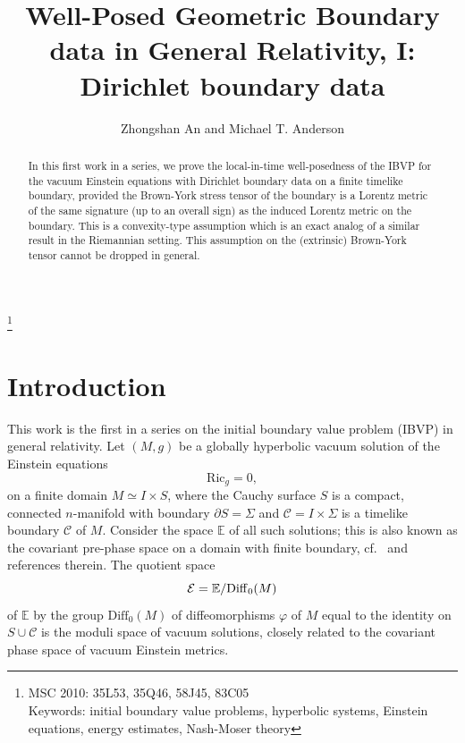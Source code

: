 \documentclass[10pt]{amsart}
\newcommand{\f}{\varphi}
\newcommand{\Si}{\Sigma}
\newcommand{\cC}{{\mathcal C}}
\newcommand{\cE}{{\mathcal E}}
\newcommand{\bE}{\mathbb E}
\newcommand{\Diff}{\mathrm{Diff}}
\newcommand{\Ric}{\mathrm{Ric}}
\newcommand{\be}{\begin{equation}}
\newcommand{\ee}{\end{equation}}
\newcommand{\p}{\partial}
\newcommand{\<}{\langle}
\renewcommand{\>}{\rangle}
\theoremstyle{plain}
\theoremstyle{remark}
\theoremstyle{definition}
\numberwithin{equation}{section}
\begin{document}
\title[ ]{Well-Posed Geometric Boundary data in General Relativity, I: Dirichlet boundary data} 

\author{Zhongshan An and Michael T. Anderson}

\address{Institute of Geometry and Physics, 
University of Science and Technology of China,
No. 99 Xiupu Road, Shanghai, China, 201305}

\address{Department of Mathematics, 
Stony Brook University,
Stony Brook, NY 11794}

\thanks{MSC 2010: 35L53, 35Q46, 58J45, 83C05\\
Keywords: initial boundary value problems, hyperbolic systems, Einstein equations, energy estimates, Nash-Moser theory}

\begin{abstract} 
In this first work in a series, we prove the local-in-time well-posedness of the IBVP for the vacuum Einstein equations with Dirichlet 
boundary data on a finite timelike boundary, provided the Brown-York stress tensor of the boundary is a Lorentz metric of the same signature 
(up to an overall sign) as the induced Lorentz metric on the boundary. This is a convexity-type assumption which is an exact analog of a similar 
result in the Riemannian setting. This assumption on the (extrinsic) Brown-York tensor cannot be dropped in general. 

\end{abstract}

\maketitle 

\section{Introduction}

  This work is the first in a series on the initial boundary value problem (IBVP) in general relativity. Let $(M, g)$ be a globally hyperbolic 
vacuum solution of the Einstein equations 
\be \label{vacuum}
\Ric_g = 0,
\ee
on a finite domain $M \simeq I\times S$, where the Cauchy surface $S$ is a compact, connected $n$-manifold with boundary $\p S = \Si$ and $\cC = I\times \Si$ is a 
timelike boundary $\cC$ of $M$. Consider the space $\bE$ of all such solutions; this is also known as the covariant pre-phase space on a domain with 
finite boundary, cf.~\cite{HW} and references therein. The quotient space 
$$\cE = \bE/{\rm Diff}_0(M)$$
of $\bE$ by the group $\Diff_0(M)$ of diffeomorphisms $\f$ of $M$ equal to the identity on $S\cup \cC$ is the moduli space of vacuum solutions, closely related to the 
covariant phase space of vacuum Einstein metrics. 
\end{document}
